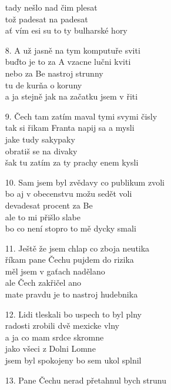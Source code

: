 \documentclass[openany]{memoir}
\begin{document}
\begin{minipage}{0.5\textwidth}
\begin{itemize}
\item[] tady nešlo nad čim plesat \\
tož padesat na padesat \\
ať vím esi su to ty bulharské hory\\
\item[8.] A už jasně na tym komputuře sviti \\
buďto je to za A vzacne lučni kviti \\
nebo za Be nastroj strunny \\
tu de kurňa o koruny \\
a ja stejně jak na začatku jsem v řiti \\
\item[9.] Čech tam zatím maval tymi svymi čisly \\
tak si řikam Franta napij sa a mysli \\
jake tudy sakypaky \\
obratiš se na divaky\\
šak tu zatím za ty prachy enem kysli \\
\item[10.] Sam jsem byl zvědavy co publikum zvoli \\
bo aj v obecenstvu možu sedět voli \\
devadesat procent za Be \\
ale to mi přišlo slabe \\
bo co není stopro to mě dycky smali \\
\item[11.] Ještě že jsem chlap co zboja neutika \\
říkam pane Čechu pujdem do rizika \\
měl jsem v gaťach nadělano \\
ale Čech zakřičel ano \\
mate pravdu je to nastroj hudebnika \\
\item[12.] Lidi tleskali bo uspech to byl plny \\
radosti zrobili dvě mexicke vlny \\
a ja co mam srdce skromne \\
jako všeci z Dolni Lomne \\
jsem byl spokojeny bo sem ukol splnil \\
\item[13.] Pane Čechu nerad přetahnul bych strunu \\

\end{itemize}
\end{minipage}
\end{document}
